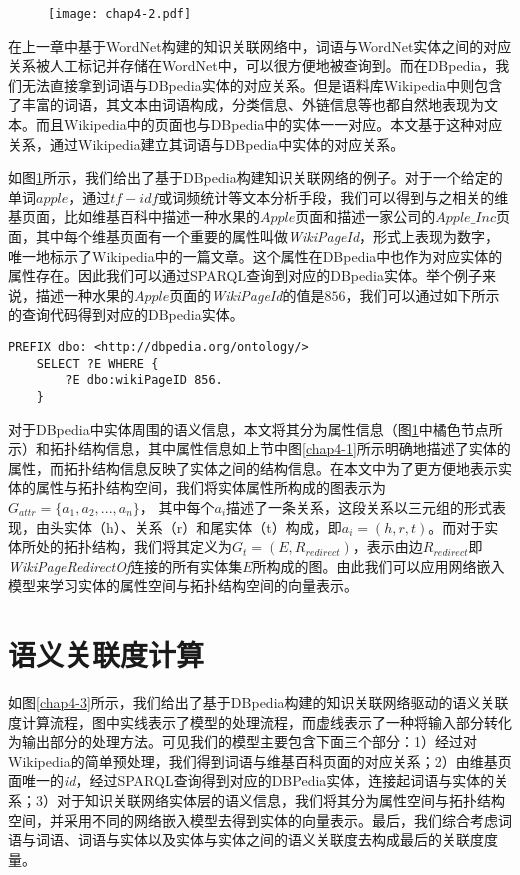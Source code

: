\begin{figure}[!ht]
    \centerline{\texttt{[image: chap4-2.pdf]}}
    \label{chap4-2}
\end{figure}

在上一章中基于WordNet构建的知识关联网络中，词语与WordNet实体之间的对应关系被人工标记并存储在WordNet中，可以很方便地被查询到。而在DBpedia，我们无法直接拿到词语与DBpedia实体的对应关系。但是语料库Wikipedia中则包含了丰富的词语，其文本由词语构成，分类信息、外链信息等也都自然地表现为文本。而且Wikipedia中的页面也与DBpedia中的实体一一对应。本文基于这种对应关系，通过Wikipedia建立其词语与DBpedia中实体的对应关系。

如图\ref{chap4-2}所示，我们给出了基于DBpedia构建知识关联网络的例子。对于一个给定的单词$apple$，通过$tf-idf$或词频统计等文本分析手段，我们可以得到与之相关的维基页面，比如维基百科中描述一种水果的$Apple$页面和描述一家公司的$Apple\_Inc$页面，其中每个维基页面有一个重要的属性叫做\emph{WikiPageId}，形式上表现为数字，唯一地标示了Wikipedia中的一篇文章。这个属性在DBpedia中也作为对应实体的属性存在。因此我们可以通过SPARQL查询到对应的DBpedia实体。举个例子来说，描述一种水果的$Apple$页面的\emph{WikiPageId}的值是$856$，我们可以通过如下所示的查询代码得到对应的DBpedia实体。

\begin{lstlisting}[basicstyle=\fontsize{10}{11}\ttfamily,aboveskip=1em,frame=shadowbox]
    PREFIX dbo: <http://dbpedia.org/ontology/>
    SELECT ?E WHERE {
        ?E dbo:wikiPageID 856.
    }
\end{lstlisting}

对于DBpedia中实体周围的语义信息，本文将其分为属性信息（图\ref{chap4-2}中橘色节点所示）和拓扑结构信息，其中属性信息如上节中图\ref{chap4-1}所示明确地描述了实体的属性，而拓扑结构信息反映了实体之间的结构信息。在本文中为了更方便地表示实体的属性与拓扑结构空间，我们将实体属性所构成的图表示为$G_{attr} = \{a_1, a_2, ..., a_n\}$， 其中每个$a_i$描述了一条关系，这段关系以三元组的形式表现，由头实体（h）、关系（r）和尾实体（t）构成，即$a_i = (h, r, t)$。而对于实体所处的拓扑结构，我们将其定义为$G_{t} = (E, R_{redirect})$，表示由边$R_{redirect}$即\emph{WikiPageRedirectOf}连接的所有实体集$E$所构成的图。由此我们可以应用网络嵌入模型来学习实体的属性空间与拓扑结构空间的向量表示。

\section{语义关联度计算}
如图\ref{chap4-3}所示，我们给出了基于DBpedia构建的知识关联网络驱动的语义关联度计算流程，图中实线表示了模型的处理流程，而虚线表示了一种将输入部分转化为输出部分的处理方法。可见我们的模型主要包含下面三个部分：1）经过对Wikipedia的简单预处理，我们得到词语与维基百科页面的对应关系；2）由维基页面唯一的\emph{id}，经过SPARQL查询得到对应的DBPedia实体，连接起词语与实体的关系；3）对于知识关联网络实体层的语义信息，我们将其分为属性空间与拓扑结构空间，并采用不同的网络嵌入模型去得到实体的向量表示。最后，我们综合考虑词语与词语、词语与实体以及实体与实体之间的语义关联度去构成最后的关联度度量。

